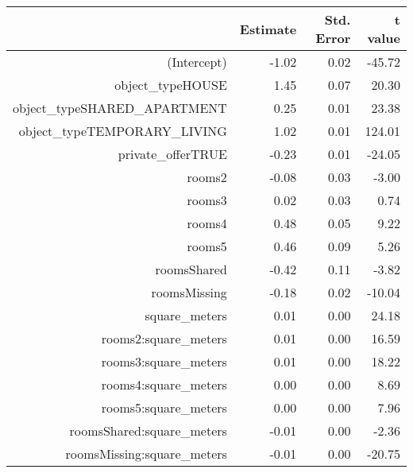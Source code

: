 \begin{table}[ht]
\centering
\begin{tabular}{rrrr}
  \hline
 & Estimate & Std. Error & t value \\ 
  \hline
(Intercept) & -1.02 & 0.02 & -45.72 \\ 
  object\_typeHOUSE & 1.45 & 0.07 & 20.30 \\ 
  object\_typeSHARED\_APARTMENT & 0.25 & 0.01 & 23.38 \\ 
  object\_typeTEMPORARY\_LIVING & 1.02 & 0.01 & 124.01 \\ 
  private\_offerTRUE & -0.23 & 0.01 & -24.05 \\ 
  rooms2 & -0.08 & 0.03 & -3.00 \\ 
  rooms3 & 0.02 & 0.03 & 0.74 \\ 
  rooms4 & 0.48 & 0.05 & 9.22 \\ 
  rooms5 & 0.46 & 0.09 & 5.26 \\ 
  roomsShared & -0.42 & 0.11 & -3.82 \\ 
  roomsMissing & -0.18 & 0.02 & -10.04 \\ 
  square\_meters & 0.01 & 0.00 & 24.18 \\ 
  rooms2:square\_meters & 0.01 & 0.00 & 16.59 \\ 
  rooms3:square\_meters & 0.01 & 0.00 & 18.22 \\ 
  rooms4:square\_meters & 0.00 & 0.00 & 8.69 \\ 
  rooms5:square\_meters & 0.00 & 0.00 & 7.96 \\ 
  roomsShared:square\_meters & -0.01 & 0.00 & -2.36 \\ 
  roomsMissing:square\_meters & -0.01 & 0.00 & -20.75 \\ 
   \hline
\end{tabular}
\end{table}
